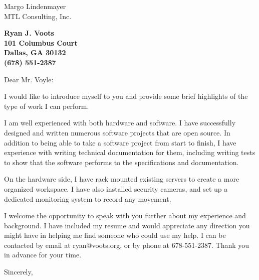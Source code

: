 \documentclass[11pt]{letter} %
\begin{document}
\signature{Ryan Voots}                  %
\longindentation=0pt                       %
\let\raggedleft\raggedright                %
 
\begin{letter}{
Margo Lindenmayer \\
MTL Consulting, Inc.}

\begin{center}
\large\bf Ryan J. Voots \\
101 Columbus Court \\ Dallas, GA 30132 \\ (678) 551-2387
\end{center} 
\vspace{1in}

\opening{Dear Mr. Voyle:}

I would like to introduce myself to you and provide some brief highlights of the type of work I can perform.

I am well experienced with both hardware and software.  I have successfully designed and written numerous software projects that are open source.  In addition to being able to take a software project from start to finish, I have experience with writing technical documentation for them, including writing tests to show that the software performs to the specifications and documentation.

On the hardware side, I have rack mounted existing servers to create a more organized workspace.  I have also installed security cameras, and set up a dedicated monitoring system to record any movement.

I welcome the opportunity to speak with you further about my experience and background.  I have included my resume and would appreciate any direction you might have in helping me find someone who could use my help.  I can be contacted by email at ryan@voots.org, or by phone at 678-551-2387.  Thank you in advance for your time. 

\closing{Sincerely,}

\end{letter}
 
\end{document}
